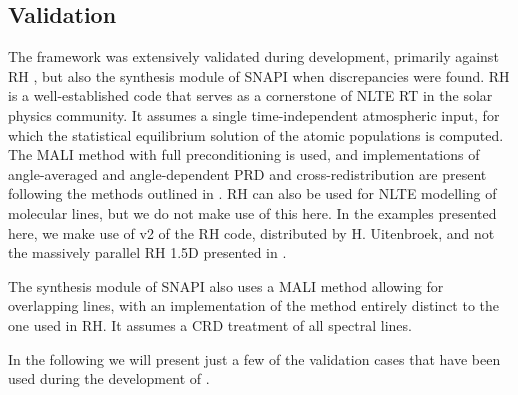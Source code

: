 \subsection{Validation}

The \Lw{} framework was extensively validated during development, primarily against RH \citep{Uitenbroek2001}, but also the synthesis module of SNAPI \citep{Milic2018} when discrepancies were found.
RH is a well-established code that serves as a cornerstone of NLTE RT in the solar physics community.
It assumes a single time-independent atmospheric input, for which the statistical equilibrium solution of the atomic populations is computed.
The MALI method with full preconditioning \citep{Rybicki1992} is used, and implementations of angle-averaged and angle-dependent PRD and cross-redistribution are present following the methods outlined in \citet{Uitenbroek2001,MillerRicci2002}.
RH can also be used for NLTE modelling of molecular lines, but we do not make use of this here.
In the examples presented here, we make use of v2 of the RH code, distributed by H. Uitenbroek, and not the massively parallel RH 1.5D presented in \citet{Pereira2015}.

The synthesis module of SNAPI also uses a MALI method allowing for overlapping lines, with an implementation of the method entirely distinct to the one used in RH.
It assumes a CRD treatment of all spectral lines.

In the following we will present just a few of the validation cases that have been used during the development of \Lw{}.

